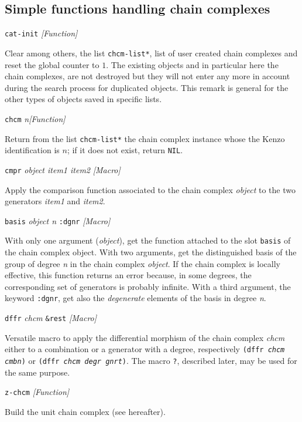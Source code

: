 \subsection {Simple functions handling chain complexes}

{\parindent=0mm
{\leftskip=5mm
{\tt cat-init} \hfill {\em [Function]} \par}
{\leftskip=15mm
Clear among others, the list {\tt *chcm-list*}, list of user created chain complexes  and reset
the global counter to $1$. The existing objects and in particular here the chain complexes, 
are not destroyed but they will not enter any more in account during the search process for duplicated
objects. This remark is general for the other types of objects saved in specific lists.   \par}
{\leftskip=5mm
{\tt chcm} {\em n}\hfill {\em [Function]} \par}
{\leftskip=15mm
Return from the list {\tt *chcm-list*} the chain complex instance whose the Kenzo identification is $n$;
if it does not exist, return {\tt NIL}. \par}
{\leftskip=5mm
{\tt cmpr} {\em object item1 item2} \hfill {\em [Macro]} \par}
{\leftskip=15mm
Apply the comparison function associated to the chain complex {\em object} to the two generators
{\em item1} and {\em item2}.  \par}
{\leftskip=5mm
{\tt basis} {\em object n} {\tt :dgnr} \hfill {\em [Macro]} \par}
{\leftskip=15mm
With only one argument ({\em object}), get the  function attached to the slot {\tt basis} of the chain complex object. 
With two arguments, 
get the distinguished basis of the group of degree {\em n} in the chain complex {\em object}. 
If the chain complex is locally effective,
this function returns an error because, in some degrees, the corresponding set of generators is 
probably infinite. With a third argument, the keyword {\tt :dgnr},  get also the {\em degenerate} 
elements of the basis in degree {\em n}.\par}
{\leftskip=5mm
{\tt dffr} {\em chcm} {\tt \&rest} \hfill {\em [Macro]} \par}
{\leftskip=15mm
Versatile macro to apply the differential morphism of the chain complex {\em chcm} either to a combination or
a generator with a degree, respectively {\tt (dffr {\em chcm cmbn})} or
{\tt (dffr {\em chcm degr gnrt})}. The macro {\tt ?}, described later, may be used for the same purpose. \par}
{\leftskip=5mm
{\tt z-chcm} \hfill {\em [Function]} \par}
{\leftskip=15mm
Build the unit chain complex (see hereafter). \par}
}
